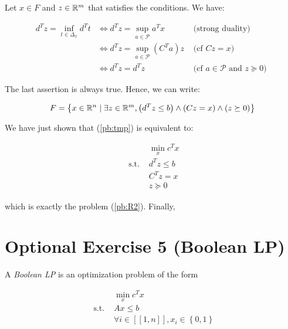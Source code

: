 \documentclass[a4paper, 11pt]{report}
\begin{document}
\noindent Let $x \in F$ and $z \in \mathbb{R}^{m}$ that satisfies the conditions. We have:

\begin{equation*}
    \begin{aligned}
    d^{T}z = \inf_{t \in \Delta_{x}} d^{T} t &\Leftrightarrow d^{T}z = \sup_{a \in \mathcal{P}} a^{T}x &\text{ (strong duality) } \\
    &\Leftrightarrow d^{T}z = \sup_{a \in \mathcal{P}} \left( C^{T} a \right) z &\text{ (cf $C z = x$) } \\
    &\Leftrightarrow d^{T}z = d^{T}z &\text{ (cf $a \in \mathcal{P}$ and $z \succeq 0$) }
    \end{aligned}
\end{equation*}

\noindent The last assertion is always true. Hence, we can write:

\begin{equation*}
    F = \left\{ x \in \mathbb{R}^{n} \mid \exists z \in \mathbb{R}^{m}, \left( d^{T}z \leq b \right) \wedge \left( C z = x \right) \wedge \left( z \succeq 0 \right)\right\}
\end{equation*}

\noindent We have just shown that (\ref{pb:tmp}) is equivalent to:

\begin{equation*}
    \begin{aligned}
    & \min_{x} c^{T} x \\
    \text{ s.t. } & d^{T}z \leq b \\
    & C^{T}z = x \\
    & z \succeq 0
    \end{aligned}
\end{equation*}

\noindent which is exactly the problem (\ref{pb:R2}). Finally,
\begin{center}
\end{center}


\section*{Optional Exercise 5 (Boolean LP)}

A \emph{Boolean LP} is an optimization problem of the form

\begin{equation*}
    \begin{aligned}
    & \min_{x} c^{T}x \\
    \text{ s.t. } & A x \leq b \\
    & \forall i \in [\![ 1, n ]\!], x_{i} \in \left\{ 0, 1 \right\}
    \end{aligned}
\end{equation*}
\end{document}
